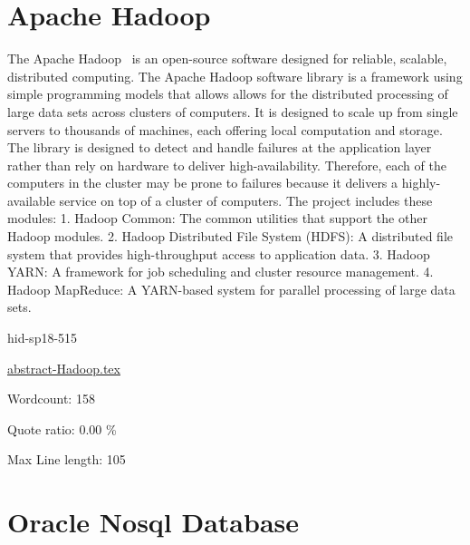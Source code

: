 \section{Apache Hadoop}

The Apache Hadoop~\cite{hid-sp18-515-www-hadoop} is an open-source 
software designed for reliable, scalable, distributed computing. 
The Apache Hadoop software library is a framework using simple programming 
models that allows allows for the distributed processing of large data sets across clusters of computers.
It is designed to scale up from single servers to thousands of machines, 
each offering local computation and storage.
The library is designed to detect and handle failures at the application 
layer rather than rely on hardware to deliver high-availability.
Therefore, each of the computers in the cluster may be prone to failures 
because it delivers a highly-available service on top of a cluster of computers. 
The project includes these modules:
1. Hadoop Common:
The common utilities that support the other Hadoop modules.
2. Hadoop Distributed File System (HDFS):
A distributed file system that provides high-throughput access to 
application data.
3. Hadoop YARN:
A framework for job scheduling and cluster resource management. 
4. Hadoop MapReduce: 
A YARN-based system for parallel processing of large data sets.


\begin{IU}

hid-sp18-515

\href{https://github.com/cloudmesh-community/hid-sp18-515/blob/master//technology/abstract-Hadoop.tex}{abstract-Hadoop.tex}

 

Wordcount: 158


Quote ratio: 0.00 \%
 
Max Line length: 105
\end{IU}

\section{Oracle Nosql Database}

